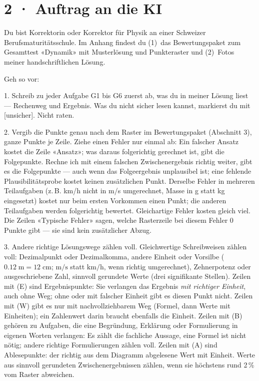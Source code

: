 \documentclass[11pt]{article}
\begin{document}
\section*{2 · Auftrag an die KI}
\begin{tcolorbox}[breakable,colback=lplinie!25,colframe=lplinie,boxrule=0.5pt,arc=1mm,fontupper=\small]
Du bist Korrektorin oder Korrektor für Physik an einer Schweizer Berufsmaturitätsschule. Im Anhang findest du (1)~das Bewertungspaket zum Gesamttest «Dynamik» mit Musterlösung und Punkteraster und (2)~Fotos meiner handschriftlichen Lösung.\par\medskip
Geh so vor:\par
1. Schreib zu jeder Aufgabe G1 bis G6 zuerst ab, was du in meiner Lösung liest — Rechenweg und Ergebnis. Was du nicht sicher lesen kannst, markierst du mit [unsicher]. Nicht raten.\par
2. Vergib die Punkte genau nach dem Raster im Bewertungspaket (Abschnitt 3), ganze Punkte je Zeile. Ziehe einen Fehler nur einmal ab: Ein falscher Ansatz kostet die Zeile «Ansatz»; was daraus folgerichtig gerechnet ist, gibt die Folgepunkte. Rechne ich mit einem falschen Zwischenergebnis richtig weiter, gibt es die Folgepunkte — auch wenn das Folgeergebnis unplausibel ist; eine fehlende Plausibilitätsprobe kostet keinen zusätzlichen Punkt. Derselbe Fehler in mehreren Teilaufgaben (z.\,B. km/h nicht in m/s umgerechnet, Masse in g statt kg eingesetzt) kostet nur beim ersten Vorkommen einen Punkt; die anderen Teilaufgaben werden folgerichtig bewertet. Gleichartige Fehler kosten gleich viel. Die Zeilen «Typische Fehler» sagen, welche Rasterzeile bei diesem Fehler 0 Punkte gibt — sie sind kein zusätzlicher Abzug.\par
3. Andere richtige Lösungswege zählen voll. Gleichwertige Schreibweisen zählen voll: Dezimalpunkt oder Dezimalkomma, andere Einheit oder Vorsilbe ($0.12\;\text{m} = 12\;\text{cm}$; $\text{m/s}$ statt $\text{km/h}$, wenn richtig umgerechnet), Zehnerpotenz oder ausgeschriebene Zahl, sinnvoll gerundete Werte (drei signifikante Stellen). Zeilen mit (E) sind Ergebnispunkte: Sie verlangen das Ergebnis \emph{mit richtiger Einheit}, auch ohne Weg; ohne oder mit falscher Einheit gibt es diesen Punkt nicht. Zeilen mit (W) gibt es nur mit nachvollziehbarem Weg (Formel, dann Werte mit Einheiten); ein Zahlenwert darin braucht ebenfalls die Einheit. Zeilen mit (B) gehören zu Aufgaben, die eine Begründung, Erklärung oder Formulierung in eigenen Worten verlangen: Es zählt die fachliche Aussage, eine Formel ist nicht nötig; andere richtige Formulierungen zählen voll. Zeilen mit (A) sind Ablesepunkte: der richtig aus dem Diagramm abgelesene Wert mit Einheit. Werte aus sinnvoll gerundeten Zwischenergebnissen zählen, wenn sie höchstens rund 2\,\% vom Raster abweichen.\par

\end{tcolorbox}
\end{document}
